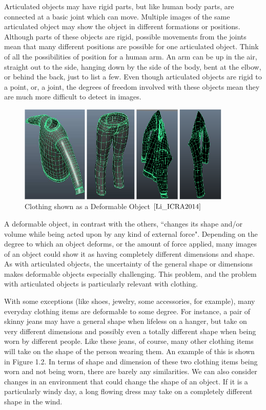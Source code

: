 \documentclass[12pt]{report} %
\begin{document}
	Articulated objects may have rigid parts, but like human body parts, are connected at a basic joint which can move\cite{szeliski2010computer}. Multiple images of the same articulated object may show the object in different formations or positions. Although parts of these objects are rigid, possible movements from the joints mean that many different positions are possible for one articulated object. Think of all the possibilities of position for a human arm. An arm can be up in the air, straight out to the side, hanging down by the side of the body, bent at the elbow, or behind the back, just to list a few. Even though articulated objects are rigid to a point, or, a joint, the degrees of freedom involved with these objects mean they are much more difficult to detect in images.
	
 \begin{figure}
\centering
\includegraphics[width=4in]{deformable} 
\caption{Clothing shown as a Deformable Object $\cite{Li_ICRA2014}$}
\label{fig: Clothing as a Deformable Object}
\end{figure}

	A deformable object, in contrast with the others, ``changes its shape and/or volume while being acted upon by any kind of external force"\cite{wolfram}. Depending on the degree to which an object deforms, or the amount of force applied, many images of an object could show it as having completely different dimensions and shape. As with articulated objects, the uncertainty of the general shape or dimensions makes deformable objects especially challenging. This problem, and the problem with articulated objects is particularly relevant with clothing. 
	
	With some exceptions (like shoes, jewelry, some accessories, for example), many everyday clothing items are deformable to some degree. For instance, a pair of skinny jeans may have a general shape when lifeless on a hanger, but take on very different dimensions and possibly even a totally different shape when being worn by different people. Like these jeans, of course, many other clothing items will take on the shape of the person wearing them. An example of this is shown in Figure 1.2\cite{Li_ICRA2014}. In terms of shape and dimension of these two clothing items being worn and not being worn, there are barely any similarities. We can also consider changes in an environment that could change the shape of an object. If it is a particularly windy day, a long flowing dress may take on a completely different shape in the wind.
\end{document}
